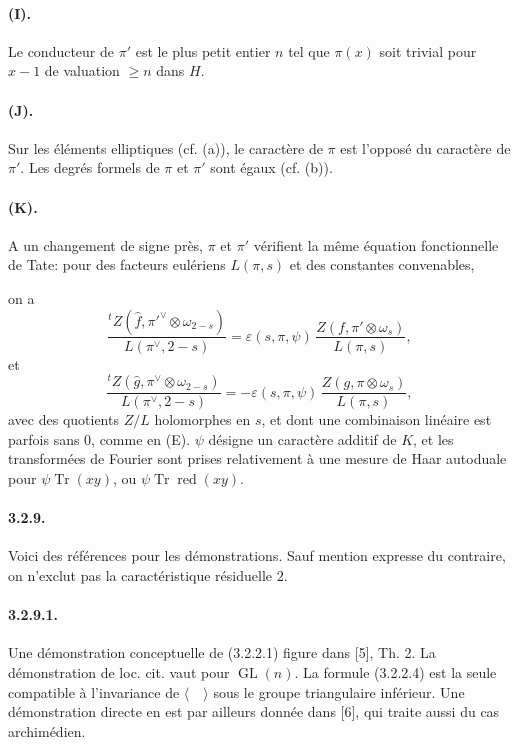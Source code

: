 \documentclass[10pt,a4paper]{article}
\providecommand{\GL}{\operatorname{GL}}
\providecommand{\Tr}{\operatorname{Tr}}
\providecommand{\red}{\operatorname{red}}
\begin{document}
\paragraph{(I).} Le conducteur de \(\pi'\) est le plus petit entier \(n\) tel que \(\pi(x)\) soit trivial pour \(x-1\) de valuation \(\ge n\) dans \(H\).

\paragraph{(J).} Sur les éléments elliptiques (cf. (a)), le caractère de \(\pi\) est l'opposé du caractère de \(\pi'\). Les degrés formels de \(\pi\) et \(\pi'\) sont égaux (cf. (b)).

\paragraph{(K).} A un changement de signe près, \(\pi\) et \(\pi'\) vérifient la même équation fonctionnelle de Tate: pour des facteurs eulériens \(L(\pi,s)\) et des \textquotedbl constantes\textquotedbl{} convenables,

\clearpage
{}
\hypertarget{authority-49}{}
on a
\[
\frac{{}^{t}Z(\widehat f,\pi'^{\vee}\otimes\omega_{2-s})}{L(\pi^{\vee},2-s)}
=
\varepsilon(s,\pi,\psi)\,
\frac{Z(f,\pi'\otimes\omega_s)}{L(\pi,s)},
\]
et
\[
\frac{{}^{t}Z(\widehat g,\pi^{\vee}\otimes\omega_{2-s})}{L(\pi^{\vee},2-s)}
=-\varepsilon(s,\pi,\psi)\,
\frac{Z(g,\pi\otimes\omega_s)}{L(\pi,s)},
\]
avec des quotients \(Z/L\) holomorphes en \(s\), et dont une combinaison linéaire est parfois sans 0, comme en (E). \(\psi\) désigne un caractère additif de \(K\), et les transformées de Fourier sont prises relativement à une mesure de Haar autoduale pour \(\psi\Tr(xy)\), ou \(\psi\Tr\red(xy)\).

\paragraph{3.2.9.} Voici des références pour les démonstrations. Sauf mention expresse du contraire, on n'exclut pas la caractéristique résiduelle \(2\).

\paragraph{3.2.9.1.} Une démonstration conceptuelle de (3.2.2.1) figure dans [5], Th. 2. La démonstration de loc. cit. vaut pour \(\GL(n)\). La formule (3.2.2.4) est la seule compatible à l'invariance de \(\langle\quad\rangle\) sous le groupe triangulaire inférieur. Une démonstration directe en est par ailleurs donnée dans [6], qui traite aussi du cas archimédien.
\end{document}
